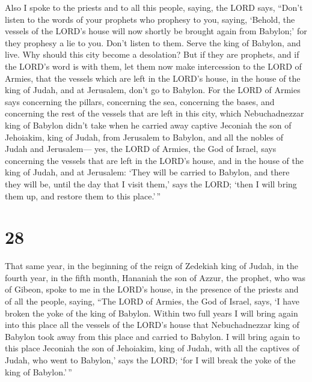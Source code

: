  Also I spoke to the priests and to all this people,
saying, the LORD says, ``Don't listen to the words of your prophets who
prophesy to you, saying, `Behold, the vessels of the LORD's house will
now shortly be brought again from Babylon;' for they prophesy a lie to
you.  Don't listen to them. Serve the king of Babylon,
and live. Why should this city become a desolation?  But
if they are prophets, and if the LORD's word is with them, let them now
make intercession to the LORD of Armies, that the vessels which are left
in the LORD's house, in the house of the king of Judah, and at
Jerusalem, don't go to Babylon.  For the LORD of Armies
says concerning the pillars, concerning the sea, concerning the bases,
and concerning the rest of the vessels that are left in this city,
 which Nebuchadnezzar king of Babylon didn't take when he
carried away captive Jeconiah the son of Jehoiakim, king of Judah, from
Jerusalem to Babylon, and all the nobles of Judah and Jerusalem---
 yes, the LORD of Armies, the God of Israel, says
concerning the vessels that are left in the LORD's house, and in the
house of the king of Judah, and at Jerusalem:  `They will
be carried to Babylon, and there they will be, until the day that I
visit them,' says the LORD; `then I will bring them up, and restore them
to this place.'\,''

\hypertarget{section-27}{%
\section{28}\label{section-27}}

 That same year, in the beginning of the reign of Zedekiah
king of Judah, in the fourth year, in the fifth month, Hananiah the son
of Azzur, the prophet, who was of Gibeon, spoke to me in the LORD's
house, in the presence of the priests and of all the people, saying,
 ``The LORD of Armies, the God of Israel, says, `I have
broken the yoke of the king of Babylon.  Within two full
years I will bring again into this place all the vessels of the LORD's
house that Nebuchadnezzar king of Babylon took away from this place and
carried to Babylon.  I will bring again to this place
Jeconiah the son of Jehoiakim, king of Judah, with all the captives of
Judah, who went to Babylon,' says the LORD; `for I will break the yoke
of the king of Babylon.'\,''

